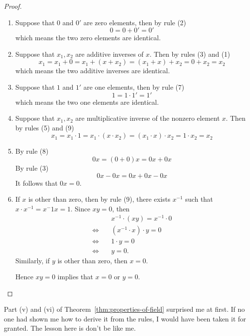 \begin{proof}
	\begin{enumerate}[label = (\roman*)]
		\item Suppose that $0$ and $0'$ are zero elements, then by rule (2)
		      \[
			      0 = 0 + 0' = 0'
		      \]
		      which means the two zero elements are identical.
		\item Suppose that $x_{1}, x_{2}$ are additive inverses of $x$. Then by rules (3) and (1)
		      \[
			      x_{1} = x_{1} + 0 = x_{1} + (x + x_{2}) = (x_{1} + x) + x_{2} = 0 + x_{2} = x_{2}
		      \]
		      which means the two additive inverses are identical.
		\item Suppose that $1$ and $1'$ are one elements, then by rule (7)
		      \[
			      1 = 1\cdot 1' = 1'
		      \]
		      which means the two one elements are identical.
		\item Suppose that $x_{1}, x_{2}$ are multiplicative inverse of the nonzero element $x$. Then by rules (5) and (9)
		      \[
			      x_{1} = x_{1}\cdot 1 = x_{1}\cdot (x\cdot x_{2}) = (x_{1}\cdot x)\cdot x_{2} = 1\cdot x_{2} = x_{2}
		      \]
		\item By rule (8)
		      \[
			      0x = (0 + 0)x = 0x + 0x
		      \]
		      By rule (3)
		      \[
			      0x - 0x = 0x + 0x - 0x
		      \]
		      It follows that $0x = 0$.
		\item If $x$ is other than zero, then by rule (9), there exists $x^{-1}$ such that $x\cdot x^{-1} = x{^-1}x = 1$. Since $xy = 0$, then
		      \begin{align*}
			                           & x^{-1}\cdot (xy) = x^{-1}\cdot 0 \\
			      \Leftrightarrow\quad & (x^{-1}\cdot x)\cdot y = 0       \\
			      \Leftrightarrow\quad & 1\cdot y = 0                     \\
			      \Leftrightarrow\quad & y = 0.
		      \end{align*}
		      Similarly, if $y$ is other than zero, then $x = 0$.

		      Hence $xy = 0$ implies that $x = 0$ or $y = 0$.
	\end{enumerate}
\end{proof}

\begin{note}
	Part (v) and (vi) of Theorem~\ref{thm:properties-of-field} surprised me at first. If no one had shown me how to derive it from the rules, I would have been taken it for granted. The lesson here is don't be like me.
\end{note}

